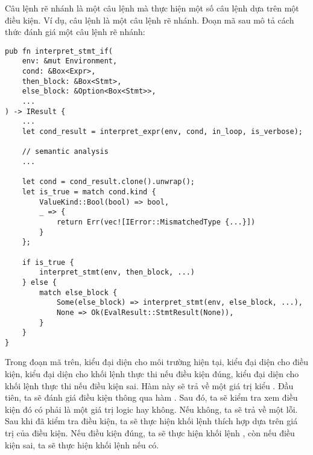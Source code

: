 Câu lệnh rẽ nhánh là một câu lệnh mà thực hiện một số câu lệnh dựa trên một điều kiện. Ví dụ, câu lệnh  là một câu lệnh rẽ nhánh. Đoạn mã sau mô tả cách thức đánh giá một câu lệnh rẽ nhánh:

\begin{lstlisting}[]
pub fn interpret_stmt_if(
    env: &mut Environment,
    cond: &Box<Expr>,
    then_block: &Box<Stmt>,
    else_block: &Option<Box<Stmt>>,
    ...
) -> IResult {
    ...
    let cond_result = interpret_expr(env, cond, in_loop, is_verbose);

    // semantic analysis
    ...

    let cond = cond_result.clone().unwrap();
    let is_true = match cond.kind {
        ValueKind::Bool(bool) => bool,
        _ => {
            return Err(vec![IError::MismatchedType {...}])
        }
    };

    if is_true {
        interpret_stmt(env, then_block, ...)
    } else {
        match else_block {
            Some(else_block) => interpret_stmt(env, else_block, ...),
            None => Ok(EvalResult::StmtResult(None)),
        }
    }
}
\end{lstlisting}

    Trong đoạn mã trên,  kiểu  đại diện cho môi trường hiện tại,  kiểu  đại diện cho điều kiện,  kiểu  đại diện cho khối lệnh thực thi nếu điều kiện đúng,  kiểu \kw{>} đại diện cho khối lệnh thực thi nếu điều kiện sai. Hàm này sẽ trả về một giá trị kiểu . Đầu tiên, ta sẽ đánh giá điều kiện thông qua hàm . Sau đó, ta sẽ kiểm tra xem điều kiện đó có phải là một giá trị logic hay không. Nếu không, ta sẽ trả về một lỗi. Sau khi đã kiểm tra điều kiện, ta sẽ thực hiện khối lệnh thích hợp dựa trên giá trị của điều kiện. Nếu điều kiện đúng, ta sẽ thực hiện khối lệnh , còn nếu điều kiện sai, ta sẽ thực hiện khối lệnh  nếu có.
